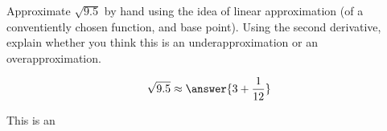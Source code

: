 \documentclass{ximera}
\author{Steven Gubkin}
\begin{document}
\begin{exercise}




Approximate $\sqrt{9.5}$ by hand using the idea of linear approximation (of a conventiently chosen function, and base point).  Using the second derivative, explain whether you think this is an underapproximation or an overapproximation.

\begin{prompt}
	$$\sqrt{9.5} \approx \answer{3+\frac{1}{12}}$$

This is an
\begin{multipleChoice}
\end{multipleChoice}
\end{prompt}

\end{exercise}
\end{document}
